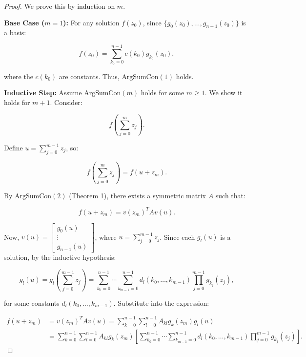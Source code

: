 \documentclass{article}
\begin{document}
	\begin{proof}
		We prove this by induction on \(m\).
		
		\textbf{Base Case (\(m = 1\)):} For any solution \(f(z_0)\), since \(\{g_0(z_0), \ldots, g_{n-1}(z_0)\}\) is a basis:
		
		\begin{equation}
			f(z_0) = \sum_{k_0=0}^{n-1} c(k_0) g_{k_0}(z_0),
		\end{equation}
		
		where the \(c(k_0)\) are constants. Thus, \(\text{ArgSumCon}(1)\) holds.
		
		\textbf{Inductive Step:} Assume \(\text{ArgSumCon}(m)\) holds for some \(m \geq 1\). We show it holds for \(m+1\). Consider:
		
		\begin{equation}
			f\left( \sum_{j=0}^{m} z_j \right).
		\end{equation}
		
		Define \(u = \sum_{j=0}^{m-1} z_j\), so:
		
		\begin{equation}
			f\left( \sum_{j=0}^{m} z_j \right) = f(u + z_m).
		\end{equation}
		
		By \(\text{ArgSumCon}(2)\) (Theorem 1), there exists a symmetric matrix \(A\) such that:
		
		\begin{equation}
			f(u + z_m) = v(z_m)^T A v(u).
		\end{equation}
		
		Now, \(v(u) = \begin{bmatrix} g_0(u) \\ \vdots \\ g_{n-1}(u) \end{bmatrix}\), where \(u = \sum_{j=0}^{m-1} z_j\). Since each \(g_l(u)\) is a solution, by the inductive hypothesis:
		
		\begin{equation}
			g_l(u) = g_l\left( \sum_{j=0}^{m-1} z_j \right) = \sum_{k_0=0}^{n-1} \cdots \sum_{k_{m-1}=0}^{n-1} d_l(k_0, \ldots, k_{m-1}) \prod_{j=0}^{m-1} g_{k_j}(z_j),
		\end{equation}
		
		for some constants \(d_l(k_0, \ldots, k_{m-1})\). Substitute into the expression:
		
		\begin{align}
			f(u + z_m) &= v(z_m)^T A v(u) = \sum_{k=0}^{n-1} \sum_{l=0}^{n-1} A_{kl} g_k(z_m) g_l(u) \\
			&= \sum_{k=0}^{n-1} \sum_{l=0}^{n-1} A_{kl} g_k(z_m) \left[ \sum_{k_0=0}^{n-1} \cdots \sum_{k_{m-1}=0}^{n-1} d_l(k_0, \ldots, k_{m-1}) \prod_{j=0}^{m-1} g_{k_j}(z_j) \right].
		\end{align}
		

\end{proof}
\end{document}

